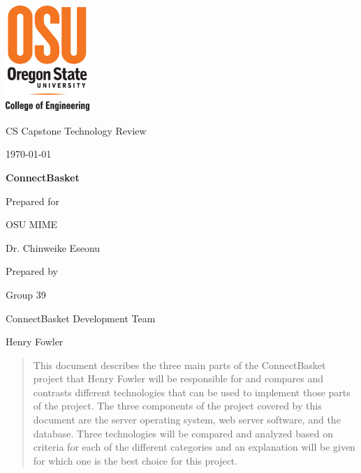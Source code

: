 \documentclass[onecolumn, draftclsnofoot,10pt, compsoc]{IEEEtran}
\def \CapstoneTeamName{		ConnectBasket Development Team}
\def \CapstoneTeamNumber{		39}
\def \GroupMemberOne{			Henry Fowler}
\def \CapstoneProjectName{		ConnectBasket}
\def \CapstoneSponsorCompany{	OSU MIME}
\def \CapstoneSponsorPerson{		Dr. Chinweike Eseonu}
\def \DocType{		%
				Technology Review
				}
\newcommand{\NameSigPair}[1]{\par
\makebox[2.75in][r]{#1} \hfil 	\makebox[3.25in]{\makebox[2.25in]{\hrulefill} \hfill		\makebox[.75in]{\hrulefill}}
\par\vspace{-12pt} \textit{\tiny\noindent
\makebox[2.75in]{} \hfil		\makebox[3.25in]{\makebox[2.25in][r]{Signature} \hfill	\makebox[.75in][r]{Date}}}}
\renewcommand{\NameSigPair}[1]{#1}
\begin{document}
\begin{titlepage}
    \begin{singlespace}
    	\includegraphics[height=4cm]{coe_v_spot1}
        \hfill 
        \par\vspace{.2in}
        \centering
        \scshape{
            \huge CS Capstone \DocType \par
            {\large\today}\par
            \vspace{.5in}
            \textbf{\Huge\CapstoneProjectName}\par
            \vfill
            {\large Prepared for}\par
            \Huge \CapstoneSponsorCompany\par
            \vspace{5pt}
            {\Large\NameSigPair{\CapstoneSponsorPerson}\par}
            {\large Prepared by }\par
            Group\CapstoneTeamNumber\par
            \CapstoneTeamName\par 
            \vspace{5pt}
            {\Large
                \NameSigPair{\GroupMemberOne}\par
            }
            \vspace{20pt}
        }
        \begin{abstract}
        This document describes the three main parts of the ConnectBasket project that Henry Fowler will be responsible for and compares and contrasts different technologies that can be used to implement those parts of the project. The three components of the project covered by this document are the server operating system, web server software, and the database. Three technologies will be compared and analyzed based on criteria for each of the different categories and an explanation will be given for which one is the best choice for this project.
        \end{abstract}     
    \end{singlespace}
\end{titlepage}
\newpage
{}
\tableofcontents
\clearpage
\end{document}
